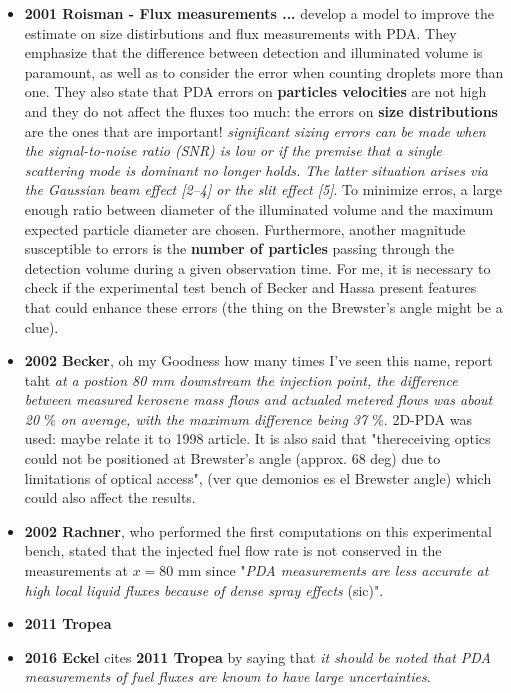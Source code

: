 \begin{itemize}
	\item \textbf{2001 Roisman - Flux measurements ...} develop a model to improve the estimate on size distirbutions and flux measurements with PDA. They emphasize that the difference between detection and illuminated volume is paramount, as well as to consider the error when counting droplets more than one. They also state that PDA errors on \textbf{particles velocities} are not high and they do not affect the fluxes too much: the errors on \textbf{size distributions} are the ones that are important! \textsl{significant sizing errors can be made when the signal-to-noise ratio (SNR) is low or if the premise that a single scattering mode is dominant no longer holds. The latter situation arises via the Gaussian beam effect [2–4] or the slit effect [5]}. To minimize erros, a large enough ratio between diameter of the illuminated volume and the maximum expected particle diameter are chosen. Furthermore, another magnitude susceptible to errors is the \textbf{number of particles} passing through the detection volume during a given observation time. For me, it is necessary to check if the experimental test bench of Becker and Hassa present features that could enhance these errors (the thing on the Brewster's angle might be a clue).

	\item \textbf{2002 Becker}, oh my Goodness how many times I've seen this name, report taht \textsl{at a postion 80 mm downstream the injection point, the difference between measured kerosene mass flows and actualed metered flows was about 20 $\%$ on average, with the maximum difference being 37 $\%$}. 2D-PDA was used: maybe relate it to 1998 article. It is also said that "thereceiving optics could not be positioned at Brewster’s angle (approx. 68 deg) due to limitations of optical access", (ver que demonios es el Brewster angle) which could also affect the results.
	
	\item \textbf{2002 Rachner}, who performed the first computations on this experimental bench, stated that the injected fuel flow rate is not conserved in the measurements at $x = 80$ mm since "\textsl{PDA
measurements are less accurate at high local liquid fluxes because of dense spray effects} (sic)".
	
	\item \textbf{2011 Tropea}
	
	\item \textbf{2016 Eckel} cites \textbf{2011 Tropea} by saying that \textsl{it should be noted that PDA measurements of fuel fluxes are known to have large uncertainties}.
	

\end{itemize}
